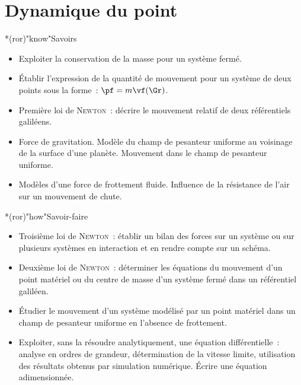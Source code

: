 \documentclass[../../main/main.tex]{subfiles}
\begin{document}
\setcounter{chapter}{1}
\chapter{Dynamique du point}

\vfill

\begin{prgm}
	\footnotesize
	\begin{tcb}*(ror)"know"{Savoirs}
		\begin{itemize}
			\item Exploiter la conservation de la masse pour un système fermé.
			\item Établir l’expression de la quantité de mouvement pour un système de
			      deux points sous la forme~: $\pf=m\vf(\Gr)$.
			\item Première loi de \textsc{Newton}~: décrire le mouvement relatif de
			      deux référentiels galiléens.
			\item Force de gravitation. Modèle du champ de pesanteur uniforme au
			      voisinage de la surface d’une planète. Mouvement dans le champ de
			      pesanteur uniforme.
			\item Modèles d’une force de frottement fluide. Influence de la résistance
			      de l’air sur un mouvement de chute.
		\end{itemize}
	\end{tcb}
	\begin{tcb}*(ror)"how"{Savoir-faire}
		\begin{itemize}
			\item Troisième loi de \textsc{Newton}~: établir un bilan des forces sur
			      un système ou sur plusieurs systèmes en interaction et en rendre
			      compte sur un schéma.
			\item Deuxième loi de \textsc{Newton}~: déterminer les équations du
			      mouvement d’un point matériel ou du centre de masse d’un système
			      fermé dans un référentiel galiléen.
			\item Étudier le mouvement d’un système modélisé par un point matériel
			      dans un champ de pesanteur uniforme en l’absence de frottement.
			\item Exploiter, sans la résoudre analytiquement, une équation
			      différentielle~: analyse en ordres de grandeur, détermination de la
			      vitesse limite, utilisation des résultats obtenus par simulation
			      numérique. Écrire une équation adimensionnée.
		\end{itemize}
	\end{tcb}
\end{prgm}
\end{document}
